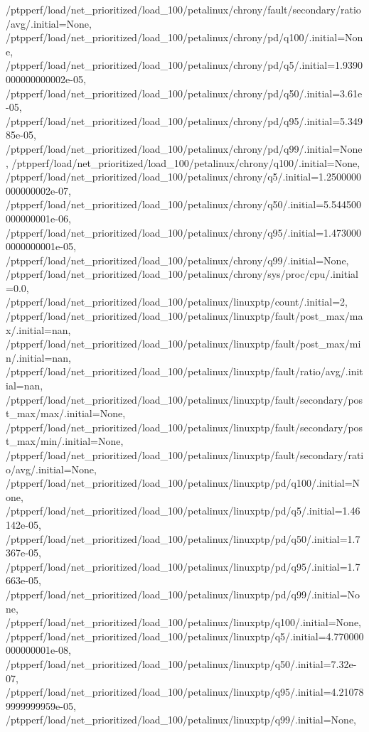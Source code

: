 {    /ptpperf/load/net_prioritized/load_100/petalinux/chrony/fault/secondary/ratio/avg/.initial=None,
    /ptpperf/load/net_prioritized/load_100/petalinux/chrony/pd/q100/.initial=None,
    /ptpperf/load/net_prioritized/load_100/petalinux/chrony/pd/q5/.initial=1.9390000000000002e-05,
    /ptpperf/load/net_prioritized/load_100/petalinux/chrony/pd/q50/.initial=3.61e-05,
    /ptpperf/load/net_prioritized/load_100/petalinux/chrony/pd/q95/.initial=5.34985e-05,
    /ptpperf/load/net_prioritized/load_100/petalinux/chrony/pd/q99/.initial=None,
    /ptpperf/load/net_prioritized/load_100/petalinux/chrony/q100/.initial=None,
    /ptpperf/load/net_prioritized/load_100/petalinux/chrony/q5/.initial=1.2500000000000002e-07,
    /ptpperf/load/net_prioritized/load_100/petalinux/chrony/q50/.initial=5.544500000000001e-06,
    /ptpperf/load/net_prioritized/load_100/petalinux/chrony/q95/.initial=1.4730000000000001e-05,
    /ptpperf/load/net_prioritized/load_100/petalinux/chrony/q99/.initial=None,
    /ptpperf/load/net_prioritized/load_100/petalinux/chrony/sys/proc/cpu/.initial=0.0,
    /ptpperf/load/net_prioritized/load_100/petalinux/linuxptp/count/.initial=2,
    /ptpperf/load/net_prioritized/load_100/petalinux/linuxptp/fault/post_max/max/.initial=nan,
    /ptpperf/load/net_prioritized/load_100/petalinux/linuxptp/fault/post_max/min/.initial=nan,
    /ptpperf/load/net_prioritized/load_100/petalinux/linuxptp/fault/ratio/avg/.initial=nan,
    /ptpperf/load/net_prioritized/load_100/petalinux/linuxptp/fault/secondary/post_max/max/.initial=None,
    /ptpperf/load/net_prioritized/load_100/petalinux/linuxptp/fault/secondary/post_max/min/.initial=None,
    /ptpperf/load/net_prioritized/load_100/petalinux/linuxptp/fault/secondary/ratio/avg/.initial=None,
    /ptpperf/load/net_prioritized/load_100/petalinux/linuxptp/pd/q100/.initial=None,
    /ptpperf/load/net_prioritized/load_100/petalinux/linuxptp/pd/q5/.initial=1.46142e-05,
    /ptpperf/load/net_prioritized/load_100/petalinux/linuxptp/pd/q50/.initial=1.7367e-05,
    /ptpperf/load/net_prioritized/load_100/petalinux/linuxptp/pd/q95/.initial=1.7663e-05,
    /ptpperf/load/net_prioritized/load_100/petalinux/linuxptp/pd/q99/.initial=None,
    /ptpperf/load/net_prioritized/load_100/petalinux/linuxptp/q100/.initial=None,
    /ptpperf/load/net_prioritized/load_100/petalinux/linuxptp/q5/.initial=4.770000000000001e-08,
    /ptpperf/load/net_prioritized/load_100/petalinux/linuxptp/q50/.initial=7.32e-07,
    /ptpperf/load/net_prioritized/load_100/petalinux/linuxptp/q95/.initial=4.210789999999959e-05,
    /ptpperf/load/net_prioritized/load_100/petalinux/linuxptp/q99/.initial=None,
}
